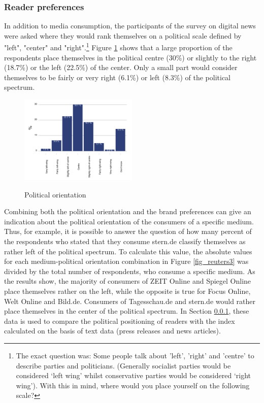 \documentclass[12pt,a4paper,notitlepage]{article}
\begin{document}
\subsubsection{Reader preferences}\label{ch_readerpref}

In addition to media consumption, the participants of the  survey on digital news were asked where they would rank themselves on a political scale defined by "left", "center" and "right".\footnote{The exact question was: Some people talk about 'left', 'right' and 'centre' to describe parties and politicians. (Generally socialist parties would be considered ‘left wing’ whilst conservative parties would be considered ‘right wing’). With this in mind, where would you place yourself on the following scale?} Figure \ref{fig_reuters2} shows that a large proportion of the respondents place themselves in the political centre (30\%) or slightly to the right (18.7\%) or the left (22.5\%) of the center. Only a small part would consider themselves to be fairly or very right (6.1\%) or left (8.3\%) of the political spectrum.

\begin{figure}[H]
\begin{center}
	\caption{Political orientation }
	\includegraphics[width=0.5\textwidth]{../figs/reuters2}
	\label{fig_reuters2}
	\end{center}
\end{figure}

Combining both the political orientation and the brand preferences can give an indication about the political orientation of the consumers of a specific medium. Thus, for example, it is possible to answer the question of how many percent of the respondents who stated that they consume stern.de classify themselves as rather left of the political spectrum. To calculate this value, the absolute values for each medium-political orientation combination in Figure \ref{fig_reuters3} was divided by the total number of respondents, who consume a specific medium. As the results show, the majority of consumers of ZEIT Online and Spiegel Online place themselves rather on the left, while the opposite is true for Focus Online, Welt Online and Bild.de. Consumers of Tagesschau.de and stern.de would rather place themselves in the center of the political spectrum. In Section \ref{ch_readerpref}, these data is used to compare the political positioning of readers with the index calculated on the basis of text data (press releases and news articles).
\end{document}
